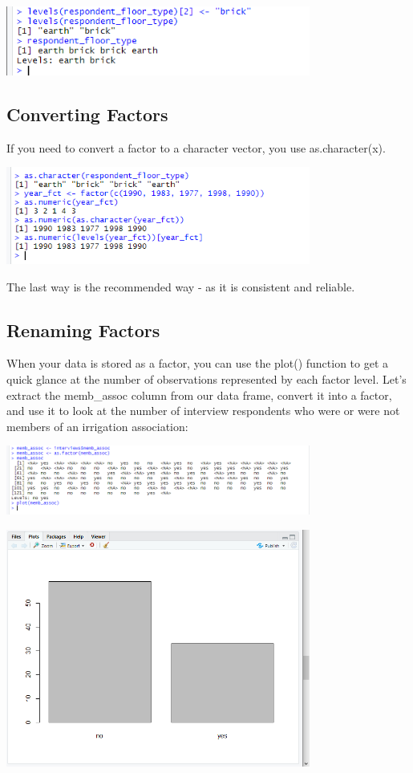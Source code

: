 \documentclass{article}
\begin{document}
\includegraphics[width=10cm]{Images/RStudio025.PNG}

\subsection{Converting Factors}

If you need to convert a factor to a character vector, you use as.character(x).

\includegraphics[width=10cm]{Images/RStudio026.PNG}

The last way is the recommended way - as it is consistent and reliable. 

\subsection{Renaming Factors}

When your data is stored as a factor, you can use the plot() function to get a quick glance at the number of observations represented by each factor level. Let’s extract the memb\_assoc column from our data frame, convert it into a factor, and use it to look at the number of interview respondents who were or were not members of an irrigation association:

\includegraphics[width=10cm]{Images/RStudio027.PNG}

\includegraphics[width=10cm]{Images/RStudio028.PNG}
\end{document}
